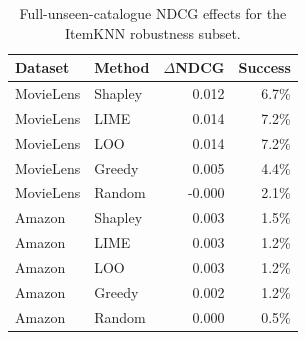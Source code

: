 \begin{table}[t]\centering\small
\caption{Full-unseen-catalogue NDCG effects for the ItemKNN robustness subset.}
\label{tab:full-catalogue}
\begin{tabular}{llrr}
\toprule
Dataset & Method & $\Delta$NDCG & Success \\
\midrule
MovieLens & Shapley & 0.012 & 6.7\% \\
MovieLens & LIME & 0.014 & 7.2\% \\
MovieLens & LOO & 0.014 & 7.2\% \\
MovieLens & Greedy & 0.005 & 4.4\% \\
MovieLens & Random & -0.000 & 2.1\% \\
\midrule
Amazon & Shapley & 0.003 & 1.5\% \\
Amazon & LIME & 0.003 & 1.2\% \\
Amazon & LOO & 0.003 & 1.2\% \\
Amazon & Greedy & 0.002 & 1.2\% \\
Amazon & Random & 0.000 & 0.5\% \\
\bottomrule
\end{tabular}
\end{table}
